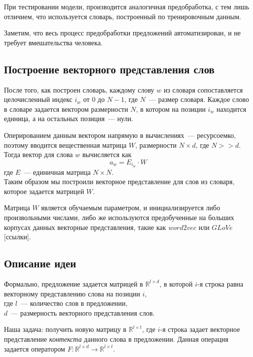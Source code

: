 При тестировании модели, производится аналогичная предобработка, 
с тем лишь отличием, что используется словарь, построенный по тренировочным данным.

Заметим, что весь процесс предобработки предложений автоматизирован, 
и не требует вмешательства человека.

\subsection{Построение векторного представления слов} \label{word_embedding}
После того, как построен словарь, каждому слову $w$ из словаря сопоставляется целочисленный индекс $i_w$ 
от $0$ до $N-1$, где $N$~--- размер словаря.
Каждое слово в словаре задается вектором размерности $N$, 
в котором на позиции $i_w$ находится единица, а на остальных позиция~--- нули.

Оперированием данным вектором напрямую в вычислениях~--- ресурсоемко, поэтому вводится вещественная матрица $W$, размерности $N \times d$, где $N >> d$.\\
Тогда вектор для слова $w$ вычисляется как
$$a_w = E_{i_w} \cdot W$$
где $E$~--- единичная матрица $N \times N$.\\
Таким образом мы построили векторное представление для слов из словаря, которое задается матрицей $W$.

Матрица $W$ является обучаемым параметром, и инициализируется либо произвольными числами, 
либо же используются предобученные на больших корпусах данных векторные представления, 
такие как $word2vec$ или $GLoVe$ [ссылки].

\subsection{Описание идеи } \label{loc_context}

Формально, предложение задается матрицей в  $\mathbb{R}^{l \times{} d}$, в которой $i$-я строка равна векторному представлению слова на позиции $i$,\\
где $l$~--- количество слов в предложении,\\
$d$~--- размерность векторного представления слов. 

Наша задача: получить новую матрицу в $\mathbb{R}^{l \times {} t}$, где $i$-я строка задает векторное представление \textit{контекста} данного слова в предложении. 
Данная операция задается оператором $F:\mathbb{R}^{l \times d} \to \mathbb{R}^{l \times t}$.

